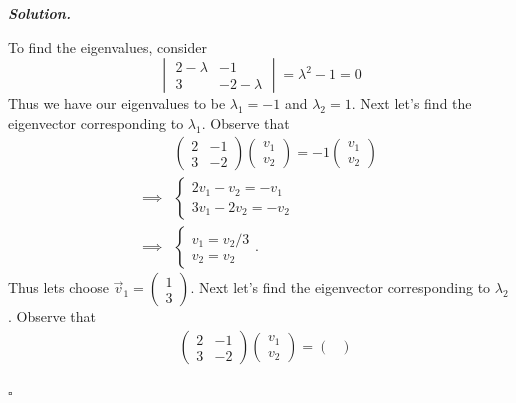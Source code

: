 \documentclass[12pt]{report}
\newenvironment{solution}[1][\it{Solution}]{\textbf{#1. } }{$\square$}
\begin{document}
\begin{solution}
\begin{enumerate}
        \noindent
        To find the eigenvalues, consider
        \[
            \begin{vmatrix}
                2 - \lambda & -1\\
                3 & -2 - \lambda
            \end{vmatrix} = \lambda^2 - 1 = 0
        \]
        Thus we have our eigenvalues to be $\lambda_1 = -1$ and $\lambda_2 = 1$. 
        Next let's find the eigenvector corresponding to $\lambda_1$. Observe that
        \begin{align*}
            &\begin{pmatrix}
                2 & -1\\
                3 & -2
            \end{pmatrix}\begin{pmatrix}
                v_1\\
                v_2
            \end{pmatrix} = -1 \begin{pmatrix}
                v_1\\
                v_2
            \end{pmatrix}\\
            \implies & \begin{cases}
                2v_1 - v_2 = -v_1\\
                3v_1 - 2v_2 = -v_2
            \end{cases}\\
            \implies &\begin{cases}
                v_1 = v_2/3\\
                v_2 = v_2
            \end{cases}.
        \end{align*}
        Thus lets choose $\vec{v}_1 = \begin{pmatrix}
            1\\
            3
        \end{pmatrix}$.
        Next let's find the eigenvector corresponding to $\lambda_2$. Observe that
        \begin{align*}
            &\begin{pmatrix}
                2 & -1\\
                3 & -2
            \end{pmatrix}\begin{pmatrix}
                v_1\\
                v_2
            \end{pmatrix} =  \begin{pmatrix}

\end{pmatrix}
\end{align*}
\end{enumerate}
\end{solution}
\end{document}
